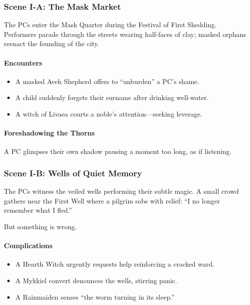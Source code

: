 \documentclass[11pt]{book}
\begin{document}
\subsubsection*{Scene I-A: The Mask Market}

The PCs enter the Mask Quarter during the Festival of First Shedding.
Performers parade through the streets wearing half-faces of clay; masked
orphans reenact the founding of the city.

\paragraph{Encounters}
\begin{itemize}[leftmargin=*]
    \item A masked Aveh Shepherd offers to ``unburden'' a PC's shame.
    \item A child suddenly forgets their surname after drinking well-water.
    \item A witch of Livaea courts a noble's attention---seeking leverage.
\end{itemize}

\paragraph{Foreshadowing the Thorns}
A PC glimpses their own shadow pausing a moment too long, as if listening.

\vspace{1em}

\subsubsection*{Scene I-B: Wells of Quiet Memory}

The PCs witness the veiled wells performing their subtle magic.
A small crowd gathers near the First Well where a pilgrim sobs with relief:
``I no longer remember what I fled.''  

But something is wrong.

\paragraph{Complications}
\begin{itemize}[leftmargin=*]
    \item A Hearth Witch urgently requests help reinforcing a cracked ward.
    \item A Mykkiel convert denounces the wells, stirring panic.
    \item A Rainmaiden senses ``the worm turning in its sleep.''
\end{itemize}
\end{document}
